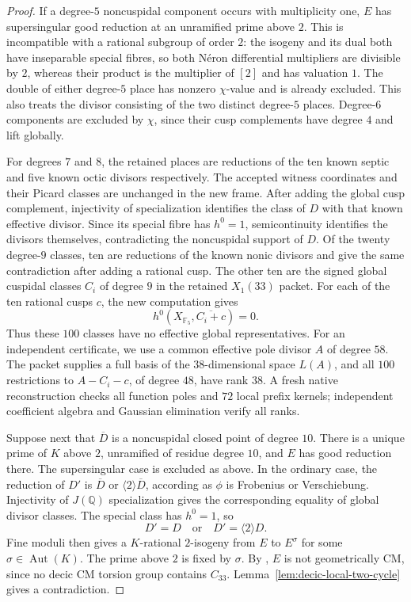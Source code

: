 \begin{proof}
If a degree-$5$ noncuspidal component occurs with multiplicity one,
$E$ has supersingular good reduction at an unramified prime above $2$.
This is incompatible with a rational subgroup of order $2$: the
isogeny and its dual both have inseparable special fibres, so both
N\'eron differential multipliers are divisible by $2$, whereas their
product is the multiplier of $[2]$ and has valuation $1$.
The double of either degree-$5$ place has nonzero $\chi$-value and is
already excluded. This also treats the divisor consisting of the two
distinct degree-$5$ places. Degree-$6$ components are excluded by
$\chi$, since their cusp complements have degree $4$ and lift globally.

For degrees $7$ and $8$, the retained places are reductions of the ten
known septic and five known octic divisors respectively. The accepted
witness coordinates and their Picard classes are unchanged in the new
frame. After adding the global cusp complement, injectivity of
specialization identifies the class of $D$ with that known effective
divisor. Since its special fibre has $h^0=1$, semicontinuity identifies
the divisors themselves, contradicting the noncuspidal support of $D$.
Of the twenty degree-$9$ classes, ten are reductions of the known
nonic divisors and give the same contradiction after adding a rational
cusp. The other ten are the signed global cuspidal classes $C_i$ of
degree $9$ in the retained $X_1(33)$ packet. For each of the ten rational
cusps $c$, the new computation gives
\[
 h^0(X_{\mathbb F_5},\overline{C_i+c})=0.
\]
Thus these $100$ classes have no effective global representatives.
For an independent certificate, we use a common effective pole divisor
$A$ of degree $58$. The packet supplies a full basis of the
$38$-dimensional space $L(A)$, and all $100$ restrictions to
$A-C_i-c$, of degree $48$, have rank $38$. A fresh native reconstruction
checks all function poles and $72$ local prefix kernels; independent
coefficient algebra and Gaussian elimination verify all ranks.

Suppose next that $\overline D$ is a noncuspidal closed point of degree
$10$. There is a unique prime of $K$ above $2$, unramified of residue
degree $10$, and $E$ has good reduction there. The supersingular case
is excluded as above. In the ordinary case, the reduction of $D'$ is
$\overline D$ or $\langle2\rangle\overline D$, according as $\phi$ is
Frobenius or Verschiebung. Injectivity of $J(\mathbb Q)$ specialization
gives the corresponding equality of global divisor classes.
The special class has $h^0=1$, so
\[
 D'=D\quad\text{or}\quad D'=\langle2\rangle D.
\]
Fine moduli then gives a $K$-rational $2$-isogeny from $E$ to $E^\sigma$
for some $\sigma\in\operatorname{Aut}(K)$. The prime above $2$ is fixed
by $\sigma$. By \cite[Section~4.10]{CCRS}, $E$ is not geometrically CM,
since no decic CM torsion group contains $C_{33}$.
Lemma~\ref{lem:decic-local-two-cycle} gives a contradiction.


\end{proof}
